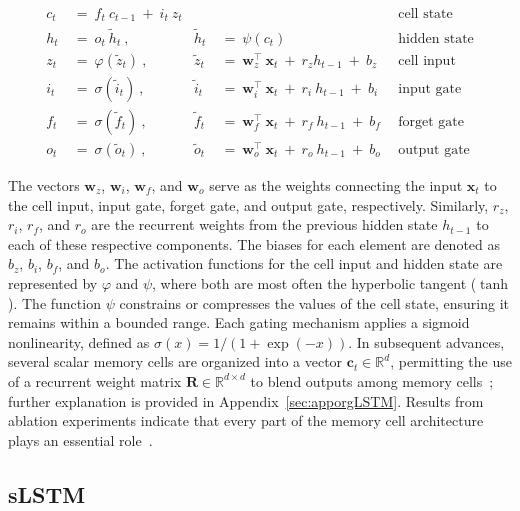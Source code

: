\begin{align}
c_t \ &= \  f_t \ c_{t-1} \ + \ i_t \ z_t &  & &\text{cell state} \\
h_t  \ &= \ o_t \ \tilde{h}_t \ , & \tilde{h}_t \ &= \ \psi \left( c_t\right)
  &\text{hidden state} \\
z_t \ &= \ \varphi \left( \tilde{z}_t \right) \ , 
  &\tilde{z}_t \ &=  \ \mathbf{w}^\top_{z} \ \mathbf{x}_t \ + \
  r_{z}  h_{t-1} \ + \  b_{z} \ \
  &\text{cell input} \\
i_t \ &= \ \sigma \left( \tilde{i}_t  \right) \ , 
  &\tilde{i}_t \ &= \ \mathbf{w}^\top_{i} \ \mathbf{x}_t \ + \
  r_{i}  \ h_{t-1} \ + \  b_{i} \ \
  &\text{input gate} \\
f_t \ &= \ \sigma \left(  \tilde{f}_t \right) \ , 
  &\tilde{f}_t \ &= \ \mathbf{w}^\top_{f} \ \mathbf{x}_t  \ + \
  r_{f}  \ h_{t-1} \ + \  b_{f} \ \
  &\text{forget gate} \\
o_t \ &= \ \sigma \left( \tilde{o}_t \right) \ , 
  &\tilde{o}_t  \ &= \ \mathbf{w}^\top_{o} \ \mathbf{x}_t \ + \
  r_{o}  \ h_{t-1} \ + \  b_{o} \ \
  &\text{output gate} 
\end{align}

The vectors $\mathbf{w}_{z}$, $\mathbf{w}_{i}$, $\mathbf{w}_{f}$, and $\mathbf{w}_{o}$ serve as the weights connecting the input $\mathbf{x}_t$ to the cell input, input gate, forget gate, and output gate, respectively. Similarly, $r_{z}$, $r_{i}$, $r_{f}$, and $r_{o}$ are the recurrent weights from the previous hidden state $h_{t-1}$ to each of these respective components. The biases for each element are denoted as $b_{z}$, $b_{i}$, $b_{f}$, and $b_{o}$. The activation functions for the cell input and hidden state are represented by $\varphi$ and $\psi$, where both are most often the hyperbolic tangent ($\tanh$). The function $\psi$ constrains or compresses the values of the cell state, ensuring it remains within a bounded range. Each gating mechanism applies a sigmoid nonlinearity, defined as $\sigma \left( x \right)= 1/(1+\exp(-x))$. In subsequent advances, several scalar memory cells are organized into a vector $\mathbf{c}_t \in \mathbb{R}^{d}$, permitting the use of a recurrent weight matrix $\mathbf{R} \in \mathbb{R}^{d \times d}$ to blend outputs among memory cells~\citep{Greff:15}; further explanation is provided in Appendix~\ref{sec:apporgLSTM}. Results from ablation experiments indicate that every part of the memory cell architecture plays an essential role~\citep{Greff:15}.

\subsection{sLSTM}
\label{sec:sLSTM}

